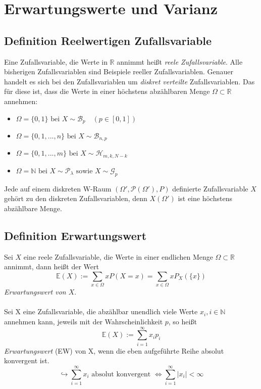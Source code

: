 \documentclass[12pt,a4paper]{article}
\begin{document}
	\section{Erwartungswerte und Varianz}
	\subsection{Definition Reelwertigen Zufallsvariable}
	Eine Zufallsvariable, die Werte in $\mathbb{R}$ annimmt heißt \textit{reele Zufallsvariable}. Alle bisherigen Zufallsvariablen sind Beispiele reeller Zufallsvariablen. Genauer handelt es sich bei den Zufallsvariablen um \textit{diskret verteilte} Zufallsvariablen. Das für diese ist, dass die Werte in einer höchstens abzählbaren Menge $\Omega\subset\mathbb{R}$ annehmen:
	
	\begin{itemize}
	\item $\Omega=\{0,1\} \text{ bei } X\sim \mathcal{B}_p \quad (p\in[0,1])$
	\item $\Omega=\{0,1,...,n\} \text{ bei } X\sim \mathcal{B}_{n,p}$
	\item $\Omega=\{0,1,...,m\} \text{ bei } X\sim\mathcal{H}_{m,k,N-k}$
	\item $\Omega=\mathbb{N} \text{ bei } X\sim \mathcal{P}_{\lambda} \text{ sowie } X\sim \mathcal{G}_p$ 
	\end{itemize}		
 	
 	Jede auf einem diskreten W-Raum $(\Omega',\mathcal{P}(\Omega'),P)$ definierte Zufallsvariable $X$ gehört zu den diskreten Zufallsvariablen, denn  	$X(\Omega')$ ist eine höchstens abzählbare Menge.
 	
 	\subsection{Definition Erwartungswert}
 	Sei $X$ eine reele Zufallsvariable, die Werte in einer endlichen Menge $\Omega\subset\mathbb{R}$ annimmt, dann heißt der Wert 
 	$$\mathbb{E}(X):=\sum_{x\in\Omega}xP(X=x)=\sum_{x\in\Omega}xP_X(\{x\})$$
 	\textit{Erwartungswert von $X$}. 
 	
 	\paragraph{}
 	Sei X eine Zufallsvariable, die abzählbar unendlich viele Werte $x_i,i\in\mathbb{N}$ annehmen kann, jeweils mit der Wahrscheinlichkeit $p$, so heißt
 	$$\mathbb{E}(X):=\sum^{\infty}_{i=1}x_i p_i$$
 	\textit{Erwartungswert} (EW) von X, wenn die eben aufgeführte Reihe absolut konvergent ist.
 	$$\hookrightarrow \sum^{\infty}_{i=1}x_i \text{ absolut konvergent } \Leftrightarrow \sum^{\infty}_{i=1}|x_i |<\infty$$
 	
\end{document}
